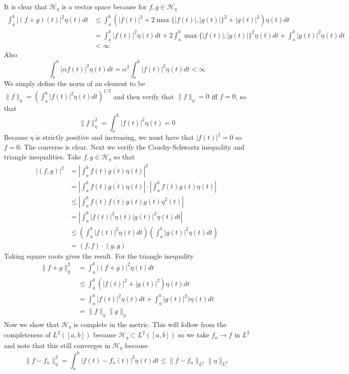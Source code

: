 \documentclass{article}
\newcommand{\problem}[1]{\noindent{\textbf{Problem #1}}\\}
\newcommand{\problempart}[1]{\noindent{\textbf{(#1)}}}
\newcommand{\norm}[1]{\|#1\|}
\begin{document}
\problem{4.7.8}
\problempart{a} It is clear that $\mathcal{H}_\eta$ is a vector space because for $f,g \in \mathcal{H}_\eta$ 
\begin{align*}
\int_{a}^b |(f+g)(t)|^2\eta(t)dt &\leq \int_a^b (|f(t)|^2 + 2\max\{|f(t)|, |g(t)|\}^2 + |g(t)|^2)\eta(t)dt \\
&= \int_a^b |f(t)|^2\eta(t)dt + 2\int_a^b \max\{|f(t)|, |g(t)|\}^2\eta(t)dt + \int_a^b |g(t)|^2\eta(t)dt \\
&< \infty
\end{align*}
Also
\[
\int_a^b |\alpha f(t)|^2\eta(t)dt = \alpha^2 \int_a^b |f(t)|^2\eta(t)dt < \infty
\]
We simply define the norm of an element to be $\norm{f}_\eta = (\int_a^b |f(t)|^2\eta(t)dt)^{1/2}$ and then verify that $\norm{f}_\eta = 0$ iff $f = 0$, so that
\[
\norm{f}_\eta^2 = \int_a^b |f(t)|^2\eta(t) = 0 
\]
Because $\eta$ is strictly positive and increasing, we must have that $|f(t)|^2 = 0$ so $f = 0$. The converse is clear. Next we verify the Cauchy-Schwartz inequality and triangle inequalities. Take $f,g \in \mathcal{H}_\eta$ so that
\begin{align*}
|(f,g)|^2 &= \left|\int_a^bf(t)\overline{g(t)}\eta(t)\right|^2 \\
&=  \left|\int_a^bf(t)\overline{g(t)}\eta(t)\right|\cdot \left|\int_a^b\overline{f(t)}g(t)\eta(t)\right|\\
&\leq \left|\int_a^b f(t)\overline{f(t)}g(t)\overline{g(t)}\eta^2(t)\right| \\
&= \left|\int_a^b |f(t)|^2\eta(t)|g(t)|^2\eta(t)dt\right| \\
&\leq \left(\int_a^b |f(t)|^2\eta(t)dt\right)\left(\int_a^b |g(t)|^2\eta(t)dt\right) \\
&= (f,f) \cdot (g,g)
\end{align*} 
Taking square roots gives the result. For the triangle inequality
\begin{align*}
\norm{f + g}_\eta^2 &= \int_a^b|(f + g)|^2\eta(t)dt \\
&\leq \int_a^b (|f(t)|^2 + |g(t)|^2)\eta(t)dt \\
&= \int_a^b |f(t)|^2\eta(t)dt + \int_a^b|g(t)|^2)\eta(t)dt \\
&= \norm{f}_\eta\norm{g}_\eta
\end{align*}
Now we show that $\mathcal{H}_\eta$ is complete in the metric. This will follow from the completeness of $L^2([a,b])$ because $\mathcal{H}_\eta \subset L^2([a,b])$ so we take $f_n \to f$ in $L^2$ and note that this still converges in $\mathcal{H}_\eta$ because
\[
\norm{f - f_n}^2_\eta = \int_a^b |f(t) - f_n(t)|^2\eta(t)dt \leq \norm{f-f_n}_{L^2}\norm{\eta}_{L^2}
\]
\end{document}
